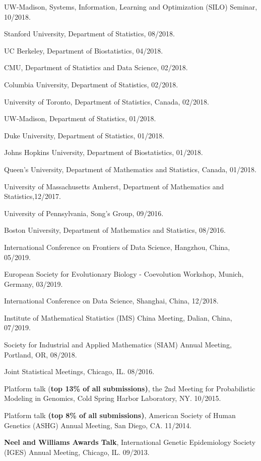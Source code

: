 \documentclass[letterpaper]{article}
\renewenvironment{itemize}{
  \begin{list}{}{
    \setlength{\leftmargin}{1.5em}
  }
}{
  \end{list}
}
\begin{document}
\begin{itemize}
\item UW-Madison, Systems, Information, Learning and Optimization (SILO) Seminar, 10/2018.
\item Stanford University, Department of Statistics, 08/2018.
\item UC Berkeley, Department of Biostatistics, 04/2018.
\item CMU, Department of Statistics and Data Science, 02/2018.
\item Columbia University, Department of Statistics, 02/2018.
\item University of Toronto, Department of Statistics, Canada, 02/2018.
\item UW-Madison, Department of Statistics, 01/2018.
\item Duke University, Department of Statistics, 01/2018.
\item Johns Hopkins University, Department of Biostatistics, 01/2018.
\item Queen's University, Department of Mathematics and Statistics, Canada, 01/2018.
\item University of Massachusetts Amherst, Department of Mathematics and Statistics,12/2017.
\item University of Pennsylvania, Song's Group, 09/2016.
\item Boston University, Department of Mathematics and Statistics, 08/2016. 

\item International Conference on Frontiers of Data Science, Hangzhou, China, 05/2019.
\item European Society for Evolutionary Biology - Coevolution Workshop, Munich, Germany, 03/2019.
\item International Conference on Data Science, Shanghai, China, 12/2018.
\item Institute of Mathematical Statistics (IMS) China Meeting, Dalian, China, 07/2019.
\item Society for Industrial and Applied Mathematics (SIAM) Annual Meeting, Portland, OR, 08/2018.
\item Joint Statistical Meetings, Chicago, IL. 08/2016. 
\item Platform talk ({\bf top 13\% of all submissions)}, the 2nd Meeting for Probabilistic Modeling in Genomics, Cold Spring Harbor Laboratory, NY. 10/2015. 
\item Platform talk {\bf (top 8\% of all submissions)}, American Society of Human Genetics (ASHG) Annual Meeting, San Diego, CA. 11/2014.
\item {\bf Neel and Williams Awards Talk}, International Genetic Epidemiology Society (IGES) Annual Meeting, Chicago, IL. 09/2013.


\end{itemize}
\end{document}
